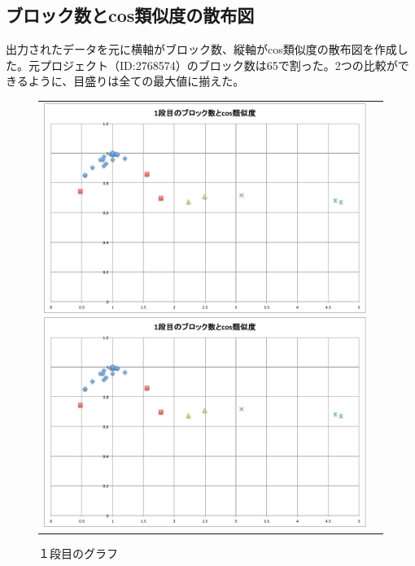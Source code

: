 \documentclass[a4paper,10pt,onecolumn,oneside,openany]{jsbook}
\begin{document}
\subsection{ブロック数とcos類似度の散布図}
 出力されたデータを元に横軸がブロック数、縦軸がcos類似度の散布図を作成した。元プロジェクト（ID:2768574）のブロック数は65で割った。2つの比較ができるように、目盛りは全ての最大値に揃えた。

\begin{figure}[h]
 \begin{tabular}{cc}
 	\begin{minipage}[t]{0.45\hsize}
	 \centering
	 \includegraphics[keepaspectratio, scale = 0.26]{mazegame_first_block.pdf}
	 \includegraphics[keepaspectratio, scale = 0.25]{mazegame_first_block.pdf}
	 \caption{１段目のグラフ}
	 \label{mazegame_first_block_cos}
	\end{minipage}
        \begin{minipage}[t]{0.45\hsize}

\end{minipage}
\end{tabular}
\end{figure}
\end{document}

